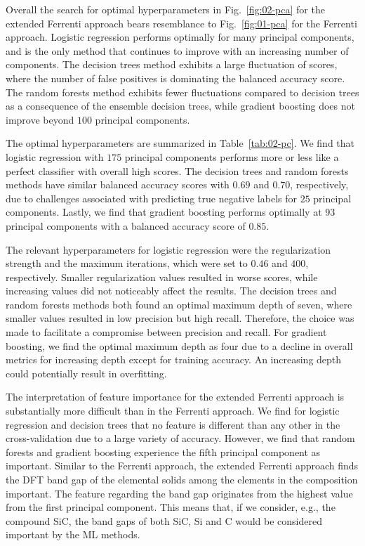 \documentclass[superscriptaddress,unsortedaddress,
 amsmath,amssymb,
 aps,
]{revtex4-2}
\begin{document}
Overall the search for optimal hyperparameters in Fig.~\ref{fig:02-pca} for the extended Ferrenti approach bears resemblance to Fig.~\ref{fig:01-pca} for the Ferrenti approach. Logistic regression performs optimally for many principal components, and is the only method that continues to improve with an increasing number of components. The decision trees method exhibits a large fluctuation of scores, where the number of false positives is dominating the balanced accuracy score. The random forests method exhibits fewer fluctuations compared to decision trees as a consequence of the ensemble decision trees, while gradient boosting does not improve beyond $100$ principal components.


The optimal hyperparameters are summarized in Table~\ref{tab:02-pc}. We find that logistic regression with $175$ principal components performs more or less like a perfect classifier with overall high scores. The decision trees and random forests methods have similar balanced accuracy scores with $0.69$ and $0.70$, respectively, due to challenges associated with predicting true negative labels for $25$ principal components. Lastly, we find that gradient boosting performs optimally at $93$ principal components with a balanced accuracy score of $0.85$. 

The relevant hyperparameters for logistic regression were the regularization strength and the maximum iterations, which were set to $0.46$ and $400$, respectively. Smaller regularization values resulted in worse scores, while increasing values did not noticeably affect the results. The decision trees and random forests methods both found an optimal maximum depth of seven, where smaller values resulted in low precision but high recall.  Therefore, the choice was made to facilitate a compromise between precision and recall. For gradient boosting, we find the optimal maximum depth as four due to a decline in overall metrics for increasing depth except for training accuracy. An increasing depth  could potentially result in overfitting.


The interpretation of feature importance for the extended Ferrenti approach is substantially more difficult than in the Ferrenti approach. We find for logistic regression and decision trees that no feature is different than any other in the cross-validation due to a large variety of accuracy. However, we find that random forests and gradient boosting experience the fifth principal component as important. 
Similar to the Ferrenti approach, the extended Ferrenti approach finds the DFT band gap of the elemental solids among the elements in the composition important. The feature regarding the band gap originates from the highest value from the first principal component. 
This means that, if we consider, e.g., the compound SiC, the band gaps of both SiC, Si and C would be considered important by the ML methods. 
\end{document}
